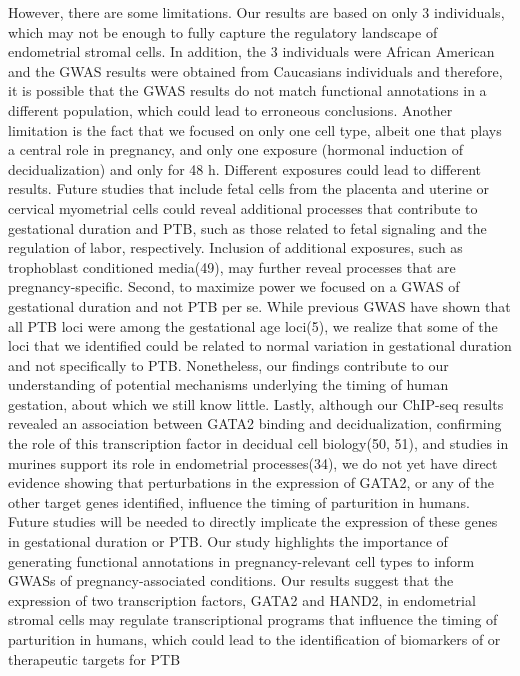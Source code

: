     However, there are some limitations. Our results are based on only 3 individuals, which may not be enough to fully capture the regulatory landscape of endometrial stromal cells. In addition, the 3 individuals were African American and the GWAS results were obtained from Caucasians individuals and therefore, it is possible that the GWAS results do not match functional annotations in a different population, which could lead to erroneous conclusions. Another limitation is the fact that we focused on only one cell type, albeit one that plays a central role in pregnancy, and only one exposure (hormonal induction of decidualization) and only for 48 h. Different exposures could lead to different results. Future studies that include fetal cells from the placenta and uterine or cervical myometrial cells could reveal additional processes that contribute to gestational duration and PTB, such as those related to fetal signaling and the regulation of labor, respectively. Inclusion of additional exposures, such as trophoblast conditioned media(49), may further reveal processes that are pregnancy-specific. Second, to maximize power we focused on a GWAS of gestational duration and not PTB per se. While previous GWAS have shown that all PTB loci were among the gestational age loci(5), we realize that some of the loci that we identified could be related to normal variation in gestational duration and not specifically to PTB. Nonetheless, our findings contribute to our understanding of potential mechanisms underlying the timing of human gestation, about which we still know little. Lastly, although our ChIP-seq results revealed an association between GATA2 binding and decidualization, confirming the role of this transcription factor in decidual cell biology(50, 51), and studies in murines support its role in endometrial processes(34), we do not yet have direct evidence showing that perturbations in the expression of GATA2, or any of the other target genes identified, influence the timing of parturition in humans. Future studies will be needed to directly implicate the expression of these genes in gestational duration or PTB. Our study highlights the importance of generating functional annotations in pregnancy-relevant cell types to inform GWASs of pregnancy-associated conditions. Our results suggest that the expression of two transcription factors, GATA2 and HAND2, in endometrial stromal cells may regulate transcriptional programs that influence the timing of parturition in humans, which could lead to the identification of biomarkers of or therapeutic targets for PTB




